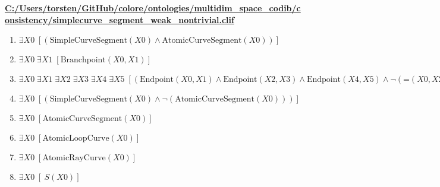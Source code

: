 \documentclass{article}
\begin{document}
\textbf{\url{C:/Users/torsten/GitHub/colore/ontologies/multidim\_space\_codib/consistency/simplecurve\_segment\_weak\_nontrivial.clif}}

\begin{enumerate}
\item $\exists X0\;  \left[ \left(\textrm{SimpleCurveSegment}(X0) \land \textrm{AtomicCurveSegment}(X0)\right) \right]$
\item $\exists X0\; \exists X1\;  \left[ \textrm{Branchpoint}(X0,X1) \right]$
\item $\exists X0\; \exists X1\; \exists X2\; \exists X3\; \exists X4\; \exists X5\;  \left[ \left(\textrm{Endpoint}(X0,X1) \land \textrm{Endpoint}(X2,X3) \land \textrm{Endpoint}(X4,X5) \land \neg \left(\textrm{=}(X0,X2)\right) \land \neg \left(\textrm{=}(X1,X3)\right) \land \textrm{=}(X0,X4) \land \neg \left(\textrm{=}(X1,X5)\right)\right) \right]$
\item $\exists X0\;  \left[ \left(\textrm{SimpleCurveSegment}(X0) \land \neg \left(\textrm{AtomicCurveSegment}(X0)\right)\right) \right]$
\item $\exists X0\;  \left[ \textrm{AtomicCurveSegment}(X0) \right]$
\item $\exists X0\;  \left[ \textrm{AtomicLoopCurve}(X0) \right]$
\item $\exists X0\;  \left[ \textrm{AtomicRayCurve}(X0) \right]$
\item $\exists X0\;  \left[ ~S(X0) \right]$
\end{enumerate}
\end{document}
